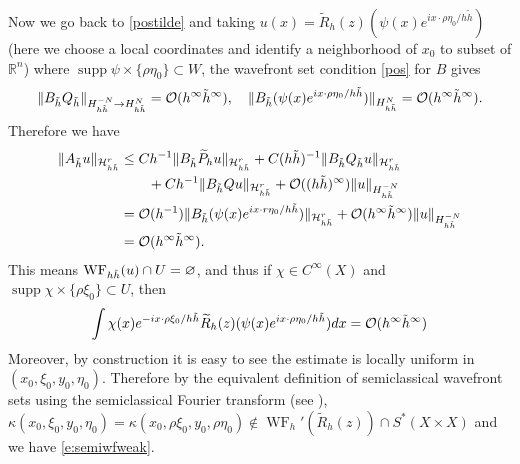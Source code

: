 \documentclass[reqno,12pt,letterpaper]{amsart}
\numberwithin{equation}{section}
\numberwithin{prop}{section}
\DeclareMathOperator{\supp}{supp}
\DeclareMathOperator{\WF}{WF}
\newcommand{\Ocal}{{\mathcal O}}
\begin{document}
Now we go back to \eqref{postilde} and taking $u(x)=\widetilde{R}_h(z)(\psi(x)e^{ix\cdot \rho\eta_0/h\tilde{h}})$ (here we choose a local coordinates and identify a neighborhood of $x_0$ to subset of $\mathbb{R}^n$) where $\supp\psi\times \{\rho\eta_0\}\subset W$, the wavefront set condition \eqref{pos} for $B$ gives
\begin{align*}
    \|B_{\tilde{h}}Q_{\tilde{h}}\|_{H^{-N}_{h\tilde{h}}\to H^N_{h\tilde{h}}} =\Ocal(h^\infty\tilde{h}^\infty),\quad \|B_{\tilde{h}}(\psi(x)e^{ix\cdot \rho\eta_0/h\Tilde{h}})\|_{H^N_{h\tilde{h}}}=\Ocal(h^\infty\tilde{h}^\infty).
\end{align*}
Therefore we have
\begin{align*}
    \|A_{\tilde{h}}u\|_{\mathcal{H}^r_{h\tilde{h}}}&\leq Ch^{-1}\|B_{\tilde{h}}\widetilde{P}_hu\|_{\mathcal{H}^r_{h\tilde{h}}}+C(h\tilde{h})^{-1}\|B_{\tilde{h}}Q_{\tilde{h}} u\|_{\mathcal{H}^r_{h\tilde{h}}}\\
    &\quad\quad +Ch^{-1}\|B_{\tilde{h}}Q u\|_{\mathcal{H}^r_{h\tilde{h}}}+\Ocal((h\tilde{h})^\infty)\|u\|_{H_{h\tilde{h}}^{-N}}
    \\
    &=\mathcal{O}(h^{-1})\|B_{\tilde{h}}(\psi(x)e^{ix\cdot r\eta_0/h\Tilde{h}})\|_{\mathcal{H}^r_{h\tilde{h}}}+\mathcal{O}(h^\infty\tilde{h}^\infty)\|u\|_{H_{h\tilde{h}}^{-N}}\\
    &=\mathcal{O}(h^\infty\Tilde{h}^\infty).
 \end{align*}
This means $\WF_{h\Tilde{h}}(u)\cap U=\varnothing$, and thus if $\chi\in C^\infty(X)$ and $\supp \chi \times \{\rho\xi_0\}\subset U$, then
\begin{align*}
        \int\chi(x)e^{-ix\cdot \rho\xi_0/h\Tilde{h}}\widetilde{R}_h(z)(\psi(x)e^{ix\cdot \rho\eta_0/h\Tilde{h}})dx=\mathcal{O}(h^\infty\Tilde{h}^\infty)
\end{align*}
Moreover, by construction it is easy to see the estimate is locally uniform in $(x_0,\xi_0,y_0,\eta_0)$. Therefore by the equivalent definition of semiclassical wavefront sets using the semiclassical Fourier transform (see \cite[Definition 3.2]{wavefront}), $\kappa(x_0,\xi_0,y_0,\eta_0)=\kappa(x_0,\rho\xi_0,y_0,\rho\eta_0)\not\in\WF_h'(\widetilde{R}_h(z))\cap S^\ast(X\times X)$ and we have \eqref{e:semiwfweak}.
\end{document}
